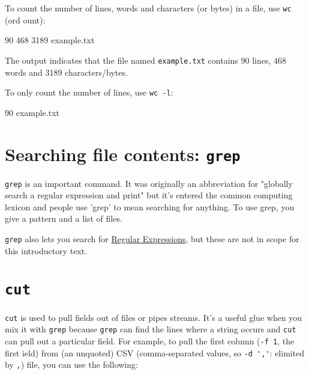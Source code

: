 To count the number of lines, words and characters (or bytes) in a file, use \lstinline|wc| (ord ount):

\begin{prompt}
      90     468    3189  example.txt
\end{prompt}

The output indicates that the file named \lstinline|example.txt| contains 90 lines, 468 words and 3189 characters/bytes.

To only count the number of lines, use \lstinline|wc -l|:

\begin{prompt}
      90    example.txt
\end{prompt}

\section{Searching file contents: \texttt{grep}}

\lstinline|grep| is an important command. It was originally an abbreviation for
"globally search a regular expression and print" but it's entered the common
computing lexicon and people use 'grep' to mean searching for anything. To use
grep, you give a pattern and a list of files.

\begin{prompt}
\end{prompt}

\lstinline|grep| also lets you search for
\href{https://en.wikipedia.org/wiki/Regular_expression}{Regular Expressions}, but
these are not in scope for this introductory text.

\section{\texttt{cut}}

\lstinline|cut| is used to pull fields out of files or pipes streams.
It's a useful glue when you mix it with \lstinline|grep| because \lstinline|grep| can find the
lines where a string occurs and \lstinline|cut| can pull out a particular field. For
example, to pull the first column (\lstinline|-f 1|, the first ield)
from (an unquoted) CSV (comma-separated values, so \lstinline|-d ','|: elimited by \lstinline|,|)
file, you can use the following:

